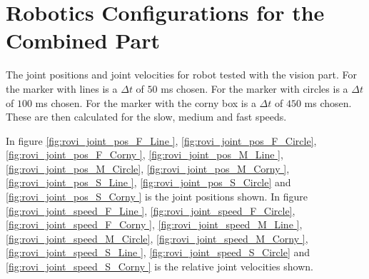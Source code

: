 \section{Robotics Configurations for the Combined Part}
\label{app:joint_positions_combined_part}

The joint positions and joint velocities for robot tested with the vision part.
For the marker with lines is a $\Delta t$ of $50$ ms chosen.
For the marker with circles is a $\Delta t$ of $100$ ms chosen.
For the marker with the corny box is a $\Delta t$ of $450$ ms chosen.
These are then calculated for the slow, medium and fast speeds.

In figure 
\ref{fig:rovi_joint_pos_F_Line  },
\ref{fig:rovi_joint_pos_F_Circle},
\ref{fig:rovi_joint_pos_F_Corny },
\ref{fig:rovi_joint_pos_M_Line  },
\ref{fig:rovi_joint_pos_M_Circle},
\ref{fig:rovi_joint_pos_M_Corny },
\ref{fig:rovi_joint_pos_S_Line  },
\ref{fig:rovi_joint_pos_S_Circle} and
\ref{fig:rovi_joint_pos_S_Corny } is the joint positions shown.
In figure 
\ref{fig:rovi_joint_speed_F_Line  }, 
\ref{fig:rovi_joint_speed_F_Circle},
\ref{fig:rovi_joint_speed_F_Corny },
\ref{fig:rovi_joint_speed_M_Line  },
\ref{fig:rovi_joint_speed_M_Circle},
\ref{fig:rovi_joint_speed_M_Corny },
\ref{fig:rovi_joint_speed_S_Line  },
\ref{fig:rovi_joint_speed_S_Circle} and
\ref{fig:rovi_joint_speed_S_Corny } is the relative joint velocities shown.

